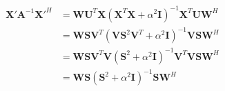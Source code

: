 \documentclass[10pt]{article}
\begin{document}
\begin{align*}\begin{split}
\boldsymbol X' \boldsymbol A^{-1} \boldsymbol X'^H &=
  \boldsymbol W \boldsymbol U^T \boldsymbol X \left(\boldsymbol X^T \boldsymbol X + \alpha^2 \boldsymbol I \right)^{-1}
   \boldsymbol X^T \boldsymbol U \boldsymbol W^H \\
  &= \boldsymbol W \boldsymbol S \boldsymbol V^T 
\left( \boldsymbol V \boldsymbol S^2 \boldsymbol V^T + \alpha^2 \boldsymbol I \right)^{-1}
\boldsymbol V \boldsymbol S \boldsymbol W^H \\
&= \boldsymbol W \boldsymbol S \boldsymbol V^T 
\boldsymbol V \left( \boldsymbol S^2 + \alpha^2 \boldsymbol I \right)^{-1}
\boldsymbol V^T \boldsymbol V\boldsymbol S \boldsymbol W^H \\
&= \boldsymbol W \boldsymbol S 
\left( \boldsymbol S^2 + \alpha^2 \boldsymbol I \right)^{-1}
\boldsymbol S \boldsymbol W^H \\
\end{split}\end{align*}
\end{document}
